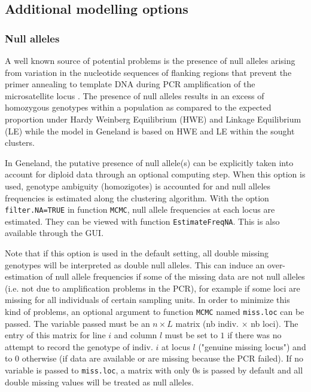 \documentclass{article}
\begin{document}
\subsection{Additional modelling options}

\subsubsection{Null alleles}\label{sec:null_alleles}

A well known source of potential problems is the
presence of null alleles arising from variation in the 
nucleotide sequences of flanking regions that prevent the primer annealing to template DNA during PCR amplification of 
the microsatellite locus \citep{Dakin04,Pompanon05}. 
The presence of null alleles results in an excess of homozygous genotypes within a population as compared to 
the expected proportion under Hardy Weinberg Equilibrium (HWE) and Linkage Equilibrium (LE)  \citep{Callen93,Paetkau95} while 
the model in {\sc Geneland} is based on HWE and LE within the sought clusters. 

In {\sc Geneland}, the putative presence of null allele(s) can be  explicitly taken into account for diploid data through an optional computing step. 
When this option is used, genotype ambiguity (homozigotes) is accounted for and null alleles frequencies is estimated 
along the clustering algorithm. 
With the option \texttt{filter.NA=TRUE} in function \texttt{MCMC}, 
null allele frequencies at each locus are estimated. 
They can be viewed with function \texttt{EstimateFreqNA}. 
This is also available through the GUI. 

Note that if this option is used in the default setting, 
all double missing genotypes will be interpreted as double
    null alleles. 
This can induce an over-estimation of null allele frequencies 
if some of the missing data are not null alleles 
(i.e. not due to amplification problems in the PCR), for example if some loci 
are missing for all individuals of certain sampling units. 
In order to minimize this kind of problems, an optional argument to function \texttt{MCMC} named \texttt{miss.loc} can be passed. 
The variable passed must be an $n \times L$  matrix (nb indiv. $\times$ nb loci). The entry of this matrix for line $i$ and column $l$ 
must be set to $1$ if there was no attempt to record the genotype of indiv. $i$ at locus $l$ ("genuine missing locus") 
and to $0$ otherwise (if data are available or are missing because  the PCR failed).
If no variable is passed to \texttt{miss.loc}, a matrix with only $0$s is passed by default and all double missing values 
will be treated as null alleles. 
\end{document}
